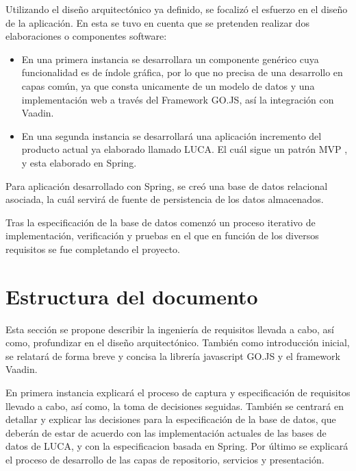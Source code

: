 \documentclass[a4paper,12pt]{book}
\begin{document}
 		\vspace{5mm}
 		
 		Utilizando el diseño arquitectónico ya definido, se focalizó el esfuerzo en el diseño de la aplicación. En esta se tuvo en cuenta que se pretenden realizar dos elaboraciones o componentes software:
 		
 		\vspace{5mm}
 		
 		\begin{itemize}
 			\item En una primera instancia se desarrollara un componente genérico cuya funcionalidad es de índole gráfica, por lo que no precisa de una desarrollo en capas común, ya que consta unicamente de un modelo de datos y una implementación web a través del Framework GO.JS, así la integración con Vaadin\cite{vaadin}.
 			
 			\item En una segunda instancia se desarrollará una aplicación incremento del producto actual ya elaborado llamado LUCA. El cuál sigue un patrón MVP \cite{mvp}, y esta elaborado en Spring\cite{spring}.
 		\end{itemize}
 	
 		\vspace{5mm}
 		
 		Para aplicación desarrollado con Spring, se creó una base de datos relacional asociada, la cuál servirá de fuente de persistencia de los datos almacenados.
 		
 		\vspace{5mm}
 		
 		Tras la especificación de la base de datos comenzó un proceso iterativo de implementación, verificación y pruebas en el que en función de los diversos requisitos se fue completando el proyecto.
 		 
	 
	 
		\section{Estructura del documento}
		
		Esta sección se propone describir la ingeniería de requisitos llevada a cabo, así como, profundizar en el diseño arquitectónico. También como introducción inicial, se relatará de forma breve y concisa la librería javascript GO.JS y el framework Vaadin.
		
		\vspace{5mm}
		
		 En primera instancia explicará el proceso de captura y especificación de requisitos llevado a cabo, así como, la toma de decisiones seguidas. También se centrará en detallar y explicar las decisiones para la especificación de la base de datos, que deberán de estar de acuerdo con las implementación actuales de las bases de datos de LUCA, y con la especificacion basada en Spring.	Por último se explicará el proceso de desarrollo de las capas de repositorio, servicios y presentación.
		
\end{document}
